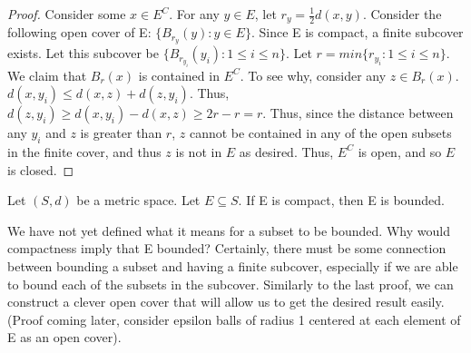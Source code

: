 \begin{thm}{}{}
\begin{proof}
Consider some \(x \in E^C\). For any \(y \in E\), let \(r_y = \frac{1}{2} d(x,y)\). Consider the following open cover of E: \(\{B_{r_y}(y) : y \in E\}\). Since E is compact, a finite subcover exists. Let this subcover be \(\{B_{r_{y_i}}(y_i) : 1 \leq i \leq n \}\). Let \(r = min \{ r_{y_{i}} : 1 \leq i \leq n \} \). We claim that \(B_r(x)\) is contained in \(E^C\). To see why, consider any \(z \in B_r(x)\). \(d(x, y_i) \leq d(x, z) + d(z, y_i)\). Thus, \(d(z, y_i) \geq d(x, y_i) - d(x,z) \geq 2r - r = r\). Thus, since the distance between any \(y_i\) and \(z\) is greater than \(r\), \(z\) cannot be contained in any of the open subsets in the finite cover, and thus \(z\) is not in \(E\) as desired. Thus, \(E^C\) is open, and so \(E\) is closed. 
\end{proof}
\end{thm}

\begin{thm}{}{}
Let \((S, d)\) be a metric space. Let \(E \subseteq S\). \newline 
If E is compact, then E is bounded. \newline 

We have not yet defined what it means for a subset to be bounded. %
Why would compactness imply that E bounded? Certainly, there must be some connection between bounding a subset and having a finite subcover, especially if we are able to bound each of the subsets in the subcover. Similarly to the last proof, we can construct a clever open cover that will allow us to get the desired result easily. (Proof coming later, consider epsilon balls of radius 1 centered at each element of E as an open cover).

\end{thm}


